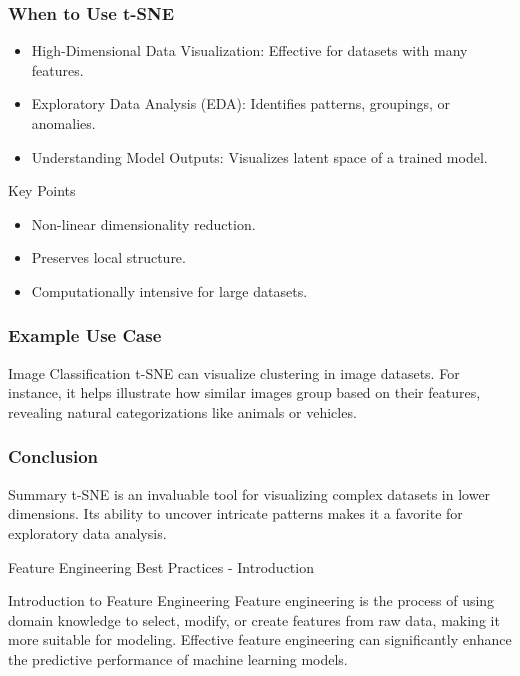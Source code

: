\documentclass[aspectratio=169]{beamer}
\begin{document}
\begin{frame}[fragile]
    \frametitle{When to Use t-SNE}
    \begin{itemize}
        \item High-Dimensional Data Visualization: Effective for datasets with many features.
        \item Exploratory Data Analysis (EDA): Identifies patterns, groupings, or anomalies.
        \item Understanding Model Outputs: Visualizes latent space of a trained model.
    \end{itemize}
    
    \begin{block}{Key Points}
        \begin{itemize}
            \item Non-linear dimensionality reduction.
            \item Preserves local structure.
            \item Computationally intensive for large datasets.
        \end{itemize}
    \end{block}
\end{frame}

\begin{frame}[fragile]
    \frametitle{Example Use Case}
    \begin{block}{Image Classification}
        t-SNE can visualize clustering in image datasets. For instance, it helps illustrate how similar images group based on their features, revealing natural categorizations like animals or vehicles.
    \end{block}
\end{frame}

\begin{frame}[fragile]
    \frametitle{Conclusion}
    \begin{block}{Summary}
        t-SNE is an invaluable tool for visualizing complex datasets in lower dimensions. Its ability to uncover intricate patterns makes it a favorite for exploratory data analysis.
    \end{block}
\end{frame}

\begin{frame}[fragile]{Feature Engineering Best Practices - Introduction}
    \begin{block}{Introduction to Feature Engineering}
        Feature engineering is the process of using domain knowledge to select, modify, or create features from raw data, making it more suitable for modeling. Effective feature engineering can significantly enhance the predictive performance of machine learning models.
    \end{block}
\end{frame}
\end{document}
